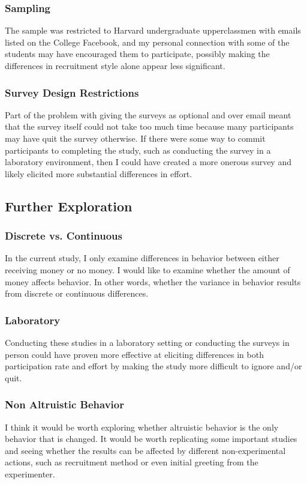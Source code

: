 \documentclass[12pt]{article}
\begin{document}
\subsubsection{Sampling}
The sample was restricted to Harvard undergraduate upperclassmen with emails listed on the College Facebook, and my personal connection with some of the students may have encouraged them to participate, possibly making the differences in recruitment style alone appear less significant. 

\subsubsection{Survey Design Restrictions}
Part of the problem with giving the surveys as optional and over email meant that the survey itself could not take too much time because many participants may have quit the survey otherwise. If there were some way to commit participants to completing the study, such as conducting the survey in a laboratory environment, then I could have created a more onerous survey and likely elicited more substantial differences in effort. 

\subsection{Further Exploration}

\subsubsection{Discrete vs. Continuous}
In the current study, I only examine differences in behavior between either receiving money or no money. I would like to examine whether the amount of money affects behavior. In other words, whether the variance in behavior results from discrete or continuous differences. 


\subsubsection{Laboratory}
Conducting these studies in a laboratory setting or conducting the surveys in person could have proven more effective at eliciting differences in both participation rate and effort by making the study more difficult to ignore and/or quit.

\subsubsection{Non Altruistic Behavior}
I think it would be worth exploring whether altruistic behavior is the only behavior that is changed. It would be worth replicating some important studies and seeing whether the results can be affected by different non-experimental actions, such as recruitment method or even initial greeting from the experimenter. 

\medskip

\end{document}
